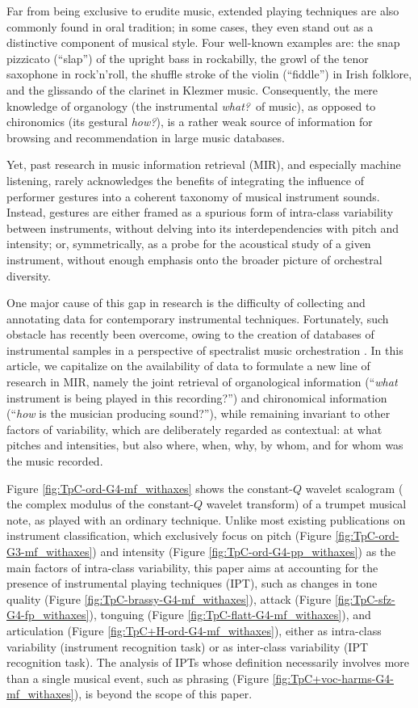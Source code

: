 Far from being exclusive to erudite music, extended playing techniques are also commonly found in oral tradition; in some cases, they even stand out as a distinctive component of musical style.
Four well-known examples are:
the snap pizzicato (``slap'') of the upright bass in rockabilly,
the growl of the tenor saxophone in rock'n'roll,
the shuffle stroke of the violin (``fiddle'') in Irish folklore,
and the glissando of the clarinet in Klezmer music.
Consequently, the mere knowledge of organology (the instrumental \emph{what?}~of music), as opposed to chironomics (its gestural \emph{how?}), is a rather weak source of information for browsing and recommendation in large music databases.

Yet, past research in music information retrieval (MIR), and especially machine listening, rarely acknowledges the benefits of integrating the influence of performer gestures into a coherent taxonomy of musical instrument sounds.
Instead, gestures are either framed as a spurious form of intra-class variability between instruments, without delving into its interdependencies with pitch and intensity;
or, symmetrically, as a probe for the acoustical study of a given instrument, without enough emphasis onto the broader picture of orchestral diversity.

One major cause of this gap in research is the difficulty of collecting and annotating data for contemporary instrumental techniques.
Fortunately, such obstacle has recently been overcome, owing to the creation of databases of instrumental samples in a perspective of spectralist music orchestration \cite{maresz2013cmr}.
In this article, we capitalize on the availability of data to formulate a new line of research in MIR, namely the joint retrieval of organological information (``\emph{what} instrument is being played in this recording?'') and chironomical information (``\emph{how} is the musician producing sound?''), while remaining invariant to other factors of variability, which are deliberately regarded as contextual: at what pitches and intensities, but also where, when, why, by whom, and for whom was the music recorded.

Figure \ref{fig:TpC-ord-G4-mf_withaxes} shows the constant-$Q$ wavelet scalogram (\ie{} the complex modulus of the constant-$Q$ wavelet transform) of a trumpet musical note, as played with an ordinary technique.
Unlike most existing publications on instrument classification, which exclusively focus on pitch (Figure \ref{fig:TpC-ord-G3-mf_withaxes}) and intensity (Figure \ref{fig:TpC-ord-G4-pp_withaxes}) as the main factors of intra-class variability, this paper aims at accounting for the presence of instrumental playing techniques (IPT), such as changes in tone quality (Figure \ref{fig:TpC-brassy-G4-mf_withaxes}), attack (Figure \ref{fig:TpC-sfz-G4-fp_withaxes}), tonguing (Figure \ref{fig:TpC-flatt-G4-mf_withaxes}), and articulation (Figure \ref{fig:TpC+H-ord-G4-mf_withaxes}), either as intra-class variability (instrument recognition task) or as inter-class variability (IPT recognition task).
The analysis of IPTs whose definition necessarily involves more than a single musical event, such as phrasing (Figure \ref{fig:TpC+voc-harms-G4-mf_withaxes}), is beyond the scope of this paper.

